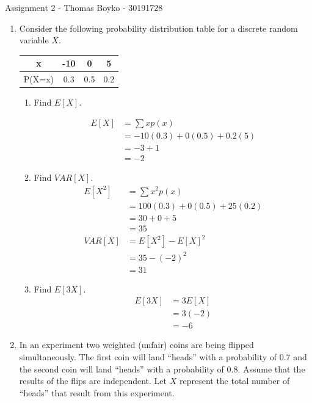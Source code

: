 \documentclass{article}
\begin{document}
\huge Assignment 2 - Thomas Boyko - 30191728

\normalsize 
\begin{enumerate}
\item Consider the following probability distribution table for a discrete random variable $X$.
\begin{center}
\begin{tabular}{|c|c|c|c|}
\hline
x & -10& 0 &5\\
\hline
P(X=x)& 0.3 &0.5& 0.2\\
\hline
\end{tabular}
\end{center}

\begin{enumerate}[label= (\alph*)] 
 
\item Find $E[X]$.

\begin{align*} 
    E[X]&=\sum\limits xp(x)\\
    &=-10(0.3)+0(0.5)+0.2(5)\\
    &=-3+1\\
    &=-2
\end{align*}
\item Find $VAR[X]$.
    \begin{align*} 
    E[X^2]&=\sum\limits x^2p(x)\\
    &=100(0.3)+0(0.5)+25(0.2)\\
    &=30+0+5\\
    &=35\\
    VAR[X]&=E[X^2]-E[X]^2\\
    &=35-(-2)^2\\
    &=31
    \end{align*}
\item Find $E[3X]$.
    \begin{align*} 
    E[3X]&=3E[X]\\
    &=3(-2)\\
    &=-6
    \end{align*}
\end{enumerate}

\item In an experiment two weighted (unfair) coins are being flipped simultaneously. The first
coin will land “heads” with a probability of $0.7$ and the second coin will land “heads” with
a probability of $0.8$. Assume that the results of the flips are independent. Let $X$ represent
the total number of “heads” that result from this experiment.


\end{enumerate}
\end{document}
